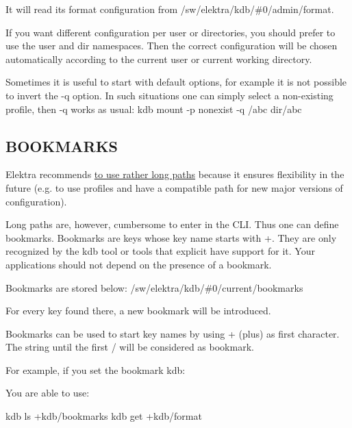 It will read its format configuration from {\ttfamily /sw/elektra/kdb/\#0/admin/format}.

If you want different configuration per user or directories, you should prefer to use the {\ttfamily user} and {\ttfamily dir} namespaces. Then the correct configuration will be chosen automatically according to the current user or current working directory.

Sometimes it is useful to start with default options, for example it is not possible to invert the {\ttfamily -\/q} option. In such situations one can simply select a non-\/existing profile, then {\ttfamily -\/q} works as usual\+: {\ttfamily kdb mount -\/p nonexist -\/q /abc dir/abc}

\subsection*{B\+O\+O\+K\+M\+A\+R\+KS}

Elektra recommends \hyperlink{doc_tutorials_application-integration_md}{to use rather long paths} because it ensures flexibility in the future (e.\+g. to use profiles and have a compatible path for new major versions of configuration).

Long paths are, however, cumbersome to enter in the C\+LI. Thus one can define bookmarks. Bookmarks are keys whose key name starts with {\ttfamily +}. They are only recognized by the {\ttfamily kdb} tool or tools that explicit have support for it. Your applications should not depend on the presence of a bookmark.

Bookmarks are stored below\+: {\ttfamily /sw/elektra/kdb/\#0/current/bookmarks}

For every key found there, a new bookmark will be introduced.

Bookmarks can be used to start key names by using {\ttfamily +} (plus) as first character. The string until the first {\ttfamily /} will be considered as bookmark.

For example, if you set the bookmark kdb\+: 


You are able to use\+: \begin{DoxyVerb}    kdb ls +kdb/bookmarks
    kdb get +kdb/format
\end{DoxyVerb}


